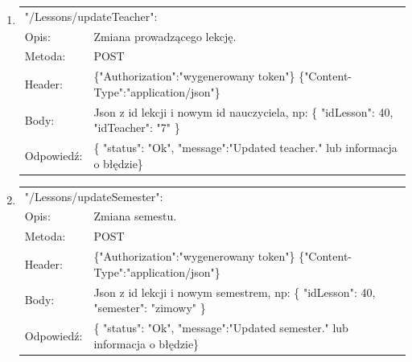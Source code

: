 \documentclass[12pt, titlepage]{article}
\begin{document}
\begin{enumerate}
	\item
	{\renewcommand{\arraystretch}{1.5}
	\begin{tabular}[t]{p{3cm} p{15cm}}
	\multicolumn{2}{l}{"/Lessons/updateTeacher":} \\
	Opis: &  Zmiana prowadzącego lekcję. \\
	Metoda: & POST \\
	Header: & \{"Authorization":"wygenerowany token"\} \newline \{"Content-Type":"application/json"\} \\
	Body: & Json z id lekcji i nowym id nauczyciela, np: \newline
	\{
	"idLesson": 40,\newline
	"idTeacher": "7"
\}\\
	Odpowiedź: & \{
    "status": "Ok",\newline
    "message":"Updated teacher." lub informacja o błędzie\} 
	\end{tabular}}
	
	\item
	{\renewcommand{\arraystretch}{1.5}
	\begin{tabular}[t]{p{3cm} p{15cm}}
	\multicolumn{2}{l}{"/Lessons/updateSemester":} \\
	Opis: & Zmiana semestu. \\
	Metoda: & POST \\
	Header: & \{"Authorization":"wygenerowany token"\} \newline \{"Content-Type":"application/json"\} \\
	Body: & Json z id lekcji i nowym semestrem, np: \newline
	\{
	"idLesson": 40,\newline
    "semester": "zimowy"
\}\\
	Odpowiedź: & \{
    "status": "Ok",\newline
    "message":"Updated semester." lub informacja o błędzie\} 
	\end{tabular}}
	

\end{enumerate}
\end{document}
